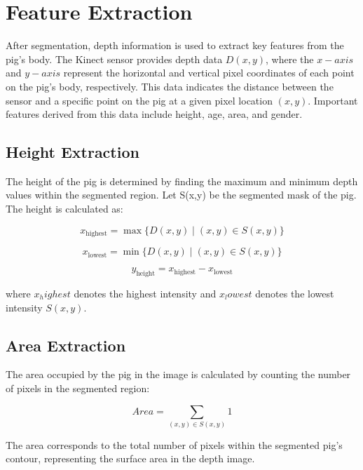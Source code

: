 {\section{Feature Extraction}
After segmentation, depth information is used to extract key features from the pig’s body. The Kinect sensor provides depth data $D(x,y)$, where the $x-axis$ and $y-axis$ represent the horizontal and vertical pixel coordinates of each point on the pig’s body, respectively. This data indicates the distance between the sensor and a specific point on the pig at a given pixel location $(x,y)$. Important features derived from this data include height, age, area, and gender.

\subsection{Height Extraction}
The height of the pig is determined by finding the maximum and minimum depth values within the segmented region. Let S(x,y) be the segmented mask of the pig. The height is calculated as:

\begin{equation}
	x_{\text{highest}} = \max\{D(x, y) \mid (x, y) \in S(x, y)\}
\end{equation}

\begin{equation}
	x_{\text{lowest}} = \min\{D(x, y) \mid (x, y) \in S(x, y)\}
\end{equation}

\begin{equation}
	y_{\text{height}} = x_{\text{highest}} - x_{\text{lowest}}
\end{equation}

where $x_highest$ denotes the highest intensity and $x_lowest$ denotes the lowest intensity $S(x,y)$.

\subsection{Area Extraction}
The area occupied by the pig in the image is calculated by counting the number of pixels in the segmented region:

\begin{equation}
	Area= \sum_{(x, y) \in S(x, y)} 1
\end{equation}

The area corresponds to the total number of pixels within the segmented pig’s contour, representing the surface area in the depth image.

}
